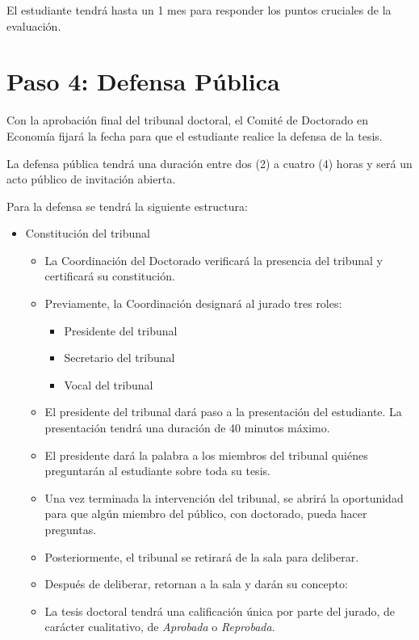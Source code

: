 El estudiante tendrá hasta un 1 mes para responder los puntos cruciales de la evaluación.

\section{Paso 4: Defensa Pública}

Con la aprobación final del tribunal doctoral, el Comité de Doctorado en Economía fijará la fecha para que el estudiante realice la defensa de la tesis.

La defensa pública tendrá una duración entre dos (2) a cuatro (4) horas y será un acto público de invitación abierta.

Para la defensa se tendrá la siguiente estructura:

\begin{itemize}
    \item 	Constitución del tribunal
    \begin{itemize}
        \item La Coordinación del Doctorado verificará la presencia del tribunal y certificará su constitución.
        \item Previamente, la Coordinación designará al jurado tres roles:
        \begin{itemize}
            \item Presidente del tribunal
            \item Secretario del tribunal
            \item Vocal del tribunal
        \end{itemize}
        \item El presidente del tribunal dará paso a la presentación del estudiante. La presentación tendrá una duración de 40 minutos máximo.
        \item El presidente dará la palabra a los miembros del tribunal quiénes preguntarán al estudiante sobre toda su tesis.
        \item Una vez terminada la intervención del tribunal, se abrirá la oportunidad para que algún miembro del público, con doctorado, pueda hacer preguntas.
        \item Posteriormente, el tribunal se retirará de la sala para deliberar.
        \item Después de deliberar, retornan a la sala y darán su concepto: 
        \item La tesis doctoral tendrá una calificación única por parte del jurado, de carácter cualitativo, de \emph{Aprobada} o \emph{Reprobada}.
    \end{itemize}
        
\end{itemize}

